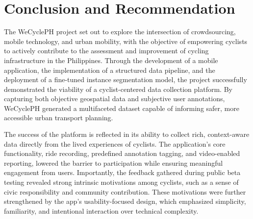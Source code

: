 %
%
%                 

\chapter{Conclusion and Recommendation}

The WeCyclePH project set out to explore the intersection of crowdsourcing, mobile technology, and urban mobility, with the objective of empowering cyclists to actively contribute to the assessment and improvement of cycling infrastructure in the Philippines. Through the development of a mobile application, the implementation of a structured data pipeline, and the deployment of a fine-tuned instance segmentation model, the project successfully demonstrated the viability of a cyclist-centered data collection platform. By capturing both objective geospatial data and subjective user annotations, WeCyclePH generated a multifaceted dataset capable of informing safer, more accessible urban transport planning.

The success of the platform is reflected in its ability to collect rich, context-aware data directly from the lived experiences of cyclists. The application's core functionality, ride recording, predefined annotation tagging, and video-enabled reporting, lowered the barrier to participation while ensuring meaningful engagement from users. Importantly, the feedback gathered during public beta testing revealed strong intrinsic motivations among cyclists, such as a sense of civic responsibility and community contribution. These motivations were further strengthened by the app's usability-focused design, which emphasized simplicity, familiarity, and intentional interaction over technical complexity.

